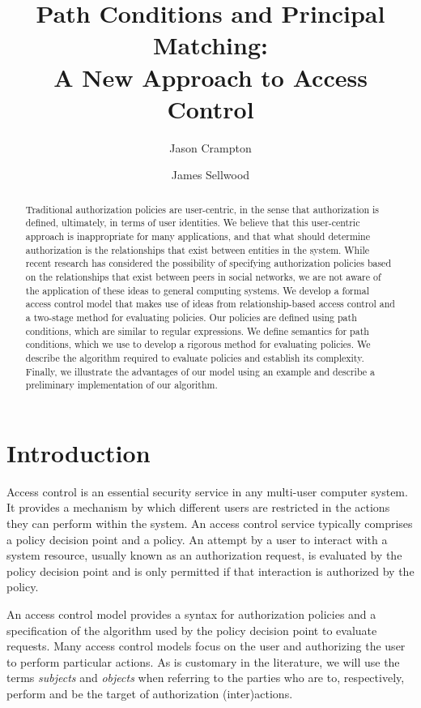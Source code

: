 \documentclass{article}
\begin{document}
\title{Path Conditions and Principal Matching:\\ A New Approach to Access Control}

\author{Jason Crampton}
\author{James Sellwood}


\maketitle
\begin{abstract}
Traditional authorization policies are user-centric, in the sense that authorization is defined, ultimately, in terms of user identities.
We believe that this user-centric approach is inappropriate for many applications, and that what should determine authorization is the relationships that exist between entities in the system.
While recent research has considered the possibility of specifying authorization policies based on the relationships that exist between peers in social networks, we are not aware of the application of these ideas to general computing systems.
We develop a formal access control model that makes use of ideas from relationship-based access control and a two-stage method for evaluating policies.
Our policies are defined using path conditions, which are similar to regular expressions.
We define semantics for path conditions, which we use to develop a rigorous method for evaluating policies.
We describe the algorithm required to evaluate policies and establish its complexity.
Finally, we illustrate the advantages of our model using an example and describe a preliminary implementation of our algorithm.
\end{abstract}


\section{Introduction}
Access control is an essential security service in any multi-user computer system.
It provides a mechanism by which different users are restricted in the actions they can perform within the system.
An access control service typically comprises a policy decision point and a policy.
An attempt by a user to interact with a system resource, usually known as an authorization request, is evaluated by the policy decision point and is only permitted if that interaction is authorized by the policy.

An access control model provides a syntax for authorization policies and a specification of the algorithm used by the policy decision point to evaluate requests.
Many access control models focus on the user and authorizing the user to perform particular actions.
As is customary in the literature, we will use the terms \emph{subjects} and \emph{objects} when referring to the parties who are to, respectively, perform and be the target of authorization (inter)actions.
\end{document}
